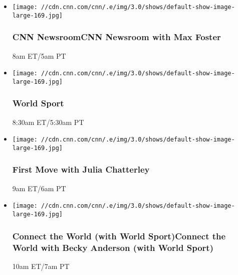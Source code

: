 \begin{itemize}
\item
  \texttt{[image: //cdn.cnn.com/cnn/.e/img/3.0/shows/default-show-image-large-169.jpg]}

  \hypertarget{cnn-newsroomcnn-newsroom-with-max-foster--2}{%
  \subsubsection{CNN NewsroomCNN Newsroom with Max Foster
  }\label{cnn-newsroomcnn-newsroom-with-max-foster--2}}

  8am ET/5am PT
\end{itemize}

\begin{itemize}
\item
  \texttt{[image: //cdn.cnn.com/cnn/.e/img/3.0/shows/default-show-image-large-169.jpg]}

  \hypertarget{world-sport-13}{%
  \subsubsection{World Sport}\label{world-sport-13}}

  8:30am ET/5:30am PT
\end{itemize}

\begin{itemize}
\item
  \texttt{[image: //cdn.cnn.com/cnn/.e/img/3.0/shows/default-show-image-large-169.jpg]}

  \hypertarget{first-move-with-julia-chatterley-2}{%
  \subsubsection{First Move with Julia
  Chatterley}\label{first-move-with-julia-chatterley-2}}

  9am ET/6am PT
\end{itemize}

\begin{itemize}
\item
  \texttt{[image: //cdn.cnn.com/cnn/.e/img/3.0/shows/default-show-image-large-169.jpg]}

  \hypertarget{connect-the-world-with-world-sportconnect-the-world-with-becky-anderson-with-world-sport--2}{%
  \subsubsection{Connect the World (with World Sport)Connect the World
  with Becky Anderson (with World Sport)
  }\label{connect-the-world-with-world-sportconnect-the-world-with-becky-anderson-with-world-sport--2}}

  10am ET/7am PT
\end{itemize}

